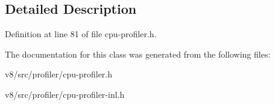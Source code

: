 \subsection{Detailed Description}


Definition at line 81 of file cpu-\/profiler.\+h.



The documentation for this class was generated from the following files\+:\begin{DoxyCompactItemize}
\item 
v8/src/profiler/cpu-\/profiler.\+h\item 
v8/src/profiler/cpu-\/profiler-\/inl.\+h\end{DoxyCompactItemize}
